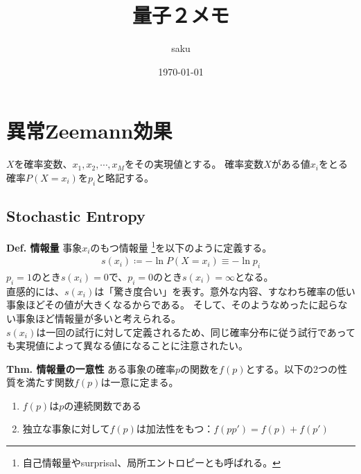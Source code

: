 \documentclass{ltjsarticle}
\begin{document}
\title{量子２メモ}
\author{saku}
\date{\today}
\maketitle

\section{異常Zeemann効果}
$X$を確率変数、$x_1, x_2, \cdots, x_M$をその実現値とする。
確率変数$X$がある値$x_i$をとる確率$P(X=x_i)$を$p_i$と略記する。\\

\subsection{Stochastic Entropy}
\begin{itembox}[l]{\textbf{Def. 情報量}}
事象$x_i$のもつ情報量 \footnote{自己情報量やsurprisal、局所エントロピーとも呼ばれる。}を以下のように定義する。
  \begin{align}
    s(x_i) \coloneq- \ln{P(X=x_i)} \equiv -\ln{p_i}
  \end{align}
$p_i=1$のとき$s(x_i)=0$で、$p_i=0$のとき$s(x_i) = \infty$となる。\\
直感的には、$s(x_i)$は「驚き度合い」を表す。意外な内容、すなわち確率の低い事象ほどその値が大きくなるからである。
そして、そのようなめったに起らない事象ほど情報量が多いと考えられる。\\
$s(x_i)$は一回の試行に対して定義されるため、同じ確率分布に従う試行であっても実現値によって異なる値になることに注意されたい。
\end{itembox}

\bigskip

\begin{itembox}[l]{\textbf{Thm. 情報量の一意性}}
ある事象の確率$p$の関数を$f(p)$とする。以下の2つの性質を満たす関数$f(p)$は一意に定まる。
  \begin{enumerate}
    \item $f(p)$は$p$の連続関数である
    \item 独立な事象に対して$f(p)$は加法性をもつ：$f(pp')=f(p)+f(p')$
  \end{enumerate}
\end{itembox}

\newpage
\end{document}
